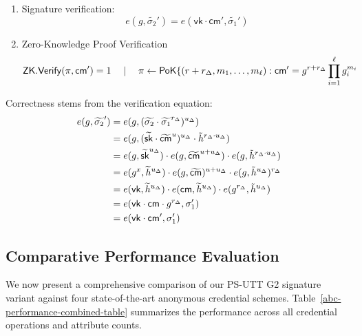 \begin{enumerate}
    \item Signature verification:
    \[
    e(g, \widetilde{\sigma_2}') = e(\mathsf{vk} \cdot \mathsf{cm}',\widetilde{\sigma_1}')
    \]
    \item Zero-Knowledge Proof Verification
    \[
    \mathsf{ZK.Verify}(\pi, \mathsf{cm}') = 1 \quad \mid \quad \pi \gets \mathsf{PoK}\{(r + r_\Delta, m_1,\ldots,m_\ell): \mathsf{cm}' = g^{r + r_\Delta} \prod_{i=1}^\ell g_i^{m_i}
    \]
\end{enumerate}

Correctness stems from the verification equation:
    \begin{align*}
        e(g, \widetilde{\sigma_2}') &= e(g, (\widetilde{\sigma_2} \cdot \widetilde{\sigma_1}^{r_\Delta})^{u_\Delta}) \\
        &= e(g, (\widetilde{\mathsf{sk}} \cdot \widetilde{\mathsf{cm}}^{u})^{u_\Delta} \cdot \tilde{h}^{r_{\Delta} \cdot u_\Delta}) \\
        &= e(g, \widetilde{\mathsf{sk}}^{u_\Delta}) \cdot e(g, \widetilde{\mathsf{cm}}^{u + u_\Delta}) \cdot e(g,\tilde{h}^{r_{\Delta} \cdot u_\Delta}) \\
        &= e(g^x, \widetilde{h}^{u_\Delta}) \cdot e(g, \widetilde{\mathsf{cm}})^{u + u_\Delta} \cdot e(g,\tilde{h}^{u_\Delta})^{r_{\Delta}} \\
        &= e(\mathsf{vk}, \widetilde{h}^{u_\Delta}) \cdot e(\mathsf{cm}, \widetilde{h}^{u_\Delta}) \cdot e(g^{r_{\Delta}},\tilde{h}^{u_\Delta}) \\
        &= e(\mathsf{vk} \cdot \mathsf{cm} \cdot g^{r_{\Delta}}, \sigma_1')  \\
        &= e(\mathsf{vk} \cdot \mathsf{cm}', \sigma_1')  \\
    \end{align*}




\subsection{Comparative Performance Evaluation}

We now present a comprehensive comparison of our PS-UTT G2 signature variant against four state-of-the-art anonymous credential schemes. Table~\ref{abc-performance-combined-table} summarizes the performance across all credential operations and attribute counts.


